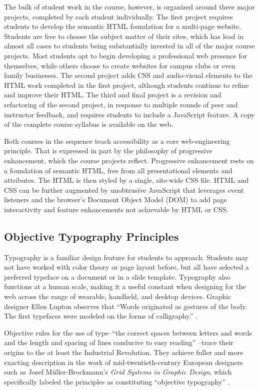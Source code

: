 \documentclass[sigplan,screen]{acmart}
\begin{document}
The bulk of student work in the course, however, is organized around three major projects, completed by each student individually. The first project requires students to develop the semantic HTML foundation for a multi-page website. Students are free to choose the subject matter of their sites, which has lead in almost all cases to students being substantially invested in all of the major course projects. Most students opt to begin developing a professional web presence for themselves, while others choose to create websites for campus clubs or even family businesses. The second project adds CSS and audio-visual elements to the HTML work completed in the first project, although students continue to refine and improve their HTML. The third and final project is a revision and refactoring of the second project, in response to multiple rounds of peer and instructor feedback, and requires students to include a JavaScript feature. A copy of the complete course syllabus is available on the web\cite{kas:fwd}.

Both courses in the sequence teach accessibility as a core web-engineering principle. That is expressed in part by the philosophy of progressive enhancement, which the course projects reflect. Progressive enhancement rests on a foundation of semantic HTML, free from all presentational elements and attributes. The HTML is then styled by a single, site-wide CSS file. HTML and CSS can be further augmented by unobtrusive JavaScript that leverages event listeners and the browser’s Document Object Model (DOM) to add page interactivity and feature enhancements not achievable by HTML or CSS.

\subsection{Objective Typography Principles}

Typography is a familiar design feature for students to approach. Students may not have worked with color theory or page layout before, but all have selected a preferred typeface on a document or in a slide template. Typography also functions at a human scale, making it a useful constant when designing for the web across the range of wearable, handheld, and desktop devices. Graphic designer Ellen Lupton observes that “Words originated as gestures of the body. The first typefaces were modeled on the forms of calligraphy.” \cite[p.~13]{el:type}.

Objective rules for the use of type--“the correct spaces between letters and words and the length and spacing of lines conducive to easy reading” \cite[p.~19]{mb:grid}--trace their origins to the at least the Industrial Revolution. They achieve fuller and more exacting description in the work of mid-twentieth-century European designers such as Josef Müller-Brockmann’s {\itshape Grid Systems in Graphic Design}, which specifically labeled the principles as constituting “objective typography” \cite[p.~7]{mb:grid}.
\end{document}

